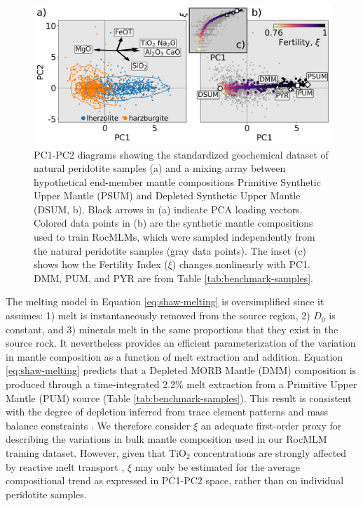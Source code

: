 \documentclass[draft,linenumbers]{agujournal2018}
\begin{document}
\begin{figure}[htbp]

{\centering \includegraphics[width=1\linewidth,]{earthchem-mixing-array} 

}

\caption{PC1-PC2 diagrams showing the standardized geochemical dataset of natural peridotite samples (a) and a mixing array between hypothetical end-member mantle compositions Primitive Synthetic Upper Mantle (PSUM) and Depleted Synthetic Upper Mantle (DSUM, b). Black arrows in (a) indicate PCA loading vectors. Colored data points in (b) are the synthetic mantle compositions used to train RocMLMs, which were sampled independently from the natural peridotite samples (gray data points). The inset (c) shows how the Fertility Index (\(\xi\)) changes nonlinearly with PC1. DMM, PUM, and PYR are from Table \ref{tab:benchmark-samples}.}\label{fig:earthchem-mixing-array}
\end{figure}

The melting model in Equation \eqref{eq:shaw-melting} is oversimplified since it assumes: 1) melt is instantaneously removed from the source region, 2) \(D_0\) is constant, and 3) minerals melt in the same proportions that they exist in the source rock. It nevertheless provides an efficient parameterization of the variation in mantle composition as a function of melt extraction and addition. Equation \eqref{eq:shaw-melting} predicts that a Depleted MORB Mantle (DMM) composition is produced through a time-integrated 2.2\% melt extraction from a Primitive Upper Mantle (PUM) source (Table \ref{tab:benchmark-samples}). This result is consistent with the degree of depletion inferred from trace element patterns and mass balance constraints \citep[2-3\% melt removal from PUM,][]{workman2005}. We therefore consider \(\xi\) an adequate first-order proxy for describing the variations in bulk mantle composition used in our RocMLM training dataset. However, given that TiO\(_2\) concentrations are strongly affected by reactive melt transport \citep[e.g.,][]{le2007}, \(\xi\) may only be estimated for the average compositional trend as expressed in PC1-PC2 space, rather than on individual peridotite samples.
\end{document}
